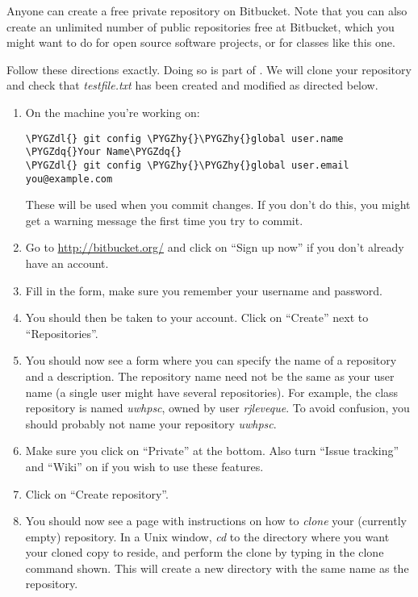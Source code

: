 \documentclass[letterpaper,10pt,english]{sphinxmanual}
\def\PYGZdl{\char`\$}
\def\PYGZhy{\char`\-}
\def\PYGZdq{\char`\"}
\begin{document}
Anyone can create a free private repository on Bitbucket.
Note that you can also create an unlimited number of public repositories
free at Bitbucket, which you might want to do for open source software
projects, or for classes like this one.

Follow these directions exactly.  Doing so is part of .
We will clone your repository and check that \emph{testfile.txt} has been created
and modified as directed below.
\begin{enumerate}
\item {} 
On the machine you're working on:

\begin{Verbatim}[commandchars=\\\{\}]
\PYGZdl{} git config \PYGZhy{}\PYGZhy{}global user.name \PYGZdq{}Your Name\PYGZdq{}
\PYGZdl{} git config \PYGZhy{}\PYGZhy{}global user.email you@example.com
\end{Verbatim}

These will be used when you commit changes.
If you don't do this, you might get a warning message
the first time you try to commit.

\item {} 
Go to \url{http://bitbucket.org/} and click on ``Sign up now'' if you don't
already have an account.

\item {} 
Fill in the form, make sure you remember your username and password.

\item {} 
You should then be taken to your account.  Click on ``Create'' next
to ``Repositories''.

\item {} 
You should now see a form where you can specify the name of a repository
and a description.  The repository name need not be the same as your user
name (a single user might have several repositories).  For example, the class
repository is named \emph{uwhpsc}, owned by user \emph{rjleveque}.
To avoid confusion, you should probably not name your repository
\emph{uwhpsc}.

\item {} 
Make sure you click on ``Private'' at the bottom.  Also turn ``Issue
tracking'' and ``Wiki'' on if you wish to use these features.

\item {} 
Click on ``Create repository''.

\item {} 
You should now see a page with instructions on how to \emph{clone} your
(currently empty) repository.  In a Unix window, \emph{cd} to the directory where
you want your cloned copy to reside, and perform the clone by typing in
the clone command shown.  This will create a new directory with the same
name as the repository.


\end{enumerate}
\end{document}
